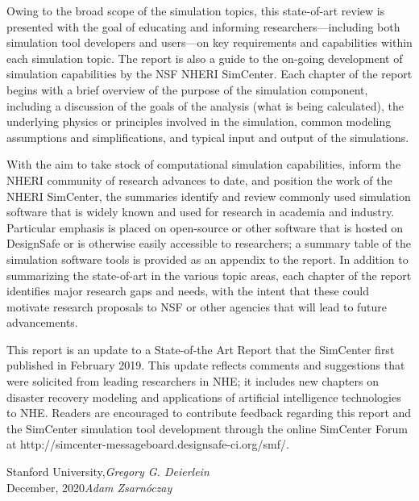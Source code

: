 Owing to the broad scope of the simulation topics, this state-of-art review is presented with the goal of educating and informing researchers---including both simulation tool developers and users---on key requirements and capabilities within each simulation topic. The report is also a guide to the on-going development of simulation capabilities by the NSF NHERI SimCenter. Each chapter of the report begins with a brief overview of the purpose of the simulation component, including a discussion of the goals of the analysis (what is being calculated), the underlying physics or principles involved in the simulation, common modeling assumptions and simplifications, and typical input and output of the simulations. 

With the aim to take stock of computational simulation capabilities, inform the NHERI community of research advances to date, and position the work of the NHERI SimCenter, the summaries identify and review commonly used simulation software that is widely known and used for research in academia and industry. Particular emphasis is placed on open-source or other software that is hosted on DesignSafe or is otherwise easily accessible to researchers; a summary table of the simulation software tools is provided as an appendix to the report. In addition to summarizing the state-of-art in the various topic areas, each chapter of the report identifies major research gaps and needs, with the intent that these could motivate research proposals to NSF or other agencies that will lead to future advancements.

This report is an update to a State-of-the Art Report that the SimCenter first published in February 2019.  This update reflects comments and suggestions that were solicited from leading researchers in NHE; it includes new chapters on disaster recovery modeling and applications of artificial intelligence technologies to NHE.  Readers are encouraged to contribute feedback regarding this report and the SimCenter simulation tool development through the online SimCenter Forum at http://simcenter-messageboard.designsafe-ci.org/smf/.


\vspace{\baselineskip}
\begin{flushright}\noindent
Stanford University,\hfill {\it Gregory G. Deierlein}\\
December, 2020\hfill {\it Adam Zsarnóczay}\\
\end{flushright}


